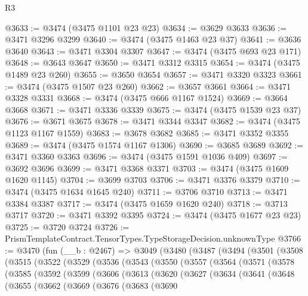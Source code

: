 \begin{lexlean}{R3}
\begin{coremodule}
@3633 := @3474 (@3475 @1101 @23 @23)
@3634 := @3629 @3633
@3636 := @3471 @3296 @3299
@3640 := @3474 (@3475 @1463 @23 @37)
@3641 := @3636 @3640
@3643 := @3471 @3304 @3307
@3647 := @3474 (@3475 @693 @23 @171)
@3648 := @3643 @3647
@3650 := @3471 @3312 @3315
@3654 := @3474 (@3475 @1489 @23 @260)
@3655 := @3650 @3654
@3657 := @3471 @3320 @3323
@3661 := @3474 (@3475 @1507 @23 @260)
@3662 := @3657 @3661
@3664 := @3471 @3328 @3331
@3668 := @3474 (@3475 @666 @1167 @1524)
@3669 := @3664 @3668
@3671 := @3471 @3336 @3339
@3675 := @3474 (@3475 @1539 @23 @37)
@3676 := @3671 @3675
@3678 := @3471 @3344 @3347
@3682 := @3474 (@3475 @1123 @1167 @1559)
@3683 := @3678 @3682
@3685 := @3471 @3352 @3355
@3689 := @3474 (@3475 @1574 @1167 @1306)
@3690 := @3685 @3689
@3692 := @3471 @3360 @3363
@3696 := @3474 (@3475 @1591 @1036 @409)
@3697 := @3692 @3696
@3699 := @3471 @3368 @3371
@3703 := @3474 (@3475 @1609 @1620 @1145)
@3704 := @3699 @3703
@3706 := @3471 @3376 @3379
@3710 := @3474 (@3475 @1634 @1645 @240)
@3711 := @3706 @3710
@3713 := @3471 @3384 @3387
@3717 := @3474 (@3475 @1659 @1620 @240)
@3718 := @3713 @3717
@3720 := @3471 @3392 @3395
@3724 := @3474 (@3475 @1677 @23 @23)
@3725 := @3720 @3724
@3726 := PrismTemplateContract.TensorTypes.TypeStorageDecision.unknownType
@3766 := @3470
    (fun (__b : @2467) =>
    @3049
      (@3480
        (@3487
          (@3494
            (@3501
              (@3508
                (@3515
                  (@3522
                    (@3529
                      (@3536
                        (@3543
                          (@3550
                            (@3557
                              (@3564
                                (@3571
                                  (@3578
                                    (@3585
                                      (@3592
                                        (@3599
                                          (@3606
                                            (@3613
                                              (@3620
                                                (@3627
                                                  (@3634
                                                    (@3641
                                                      (@3648
                                                        (@3655
                                                          (@3662
                                                            (@3669
                                                              (@3676
                                                                (@3683
                                                                  (@3690

\end{coremodule}
\end{lexlean}
